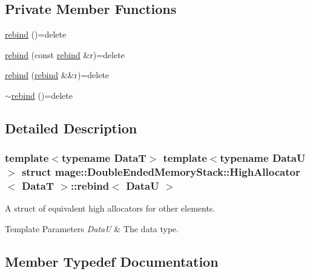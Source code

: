 \subsection*{Private Member Functions}
\begin{DoxyCompactItemize}
\item 
\hyperlink{structmage_1_1_double_ended_memory_stack_1_1_high_allocator_1_1rebind_ae8b23efa6f7435efbab9add1ce097c99}{rebind} ()=delete
\item 
\hyperlink{structmage_1_1_double_ended_memory_stack_1_1_high_allocator_1_1rebind_a88c79557499775912a9697151b0a6282}{rebind} (const \hyperlink{structmage_1_1_double_ended_memory_stack_1_1_high_allocator_1_1rebind}{rebind} \&r)=delete
\item 
\hyperlink{structmage_1_1_double_ended_memory_stack_1_1_high_allocator_1_1rebind_a8027a8c5ed9e55a9e3db30f0d9dc3347}{rebind} (\hyperlink{structmage_1_1_double_ended_memory_stack_1_1_high_allocator_1_1rebind}{rebind} \&\&r)=delete
\item 
\hyperlink{structmage_1_1_double_ended_memory_stack_1_1_high_allocator_1_1rebind_a6773f76027334ab9887e27d71dfe40f7}{$\sim$rebind} ()=delete
\end{DoxyCompactItemize}


\subsection{Detailed Description}
\subsubsection*{template$<$typename DataT$>$\newline
template$<$typename DataU$>$\newline
struct mage\+::\+Double\+Ended\+Memory\+Stack\+::\+High\+Allocator$<$ Data\+T $>$\+::rebind$<$ Data\+U $>$}

A struct of equivalent high allocators for other elements.


\begin{DoxyTemplParams}{Template Parameters}
{\em DataU} & The data type. \\
\hline
\end{DoxyTemplParams}


\subsection{Member Typedef Documentation}
\hypertarget{structmage_1_1_double_ended_memory_stack_1_1_high_allocator_1_1rebind_aee127399c76826ea9b23986ee10f19fa}{}\label{structmage_1_1_double_ended_memory_stack_1_1_high_allocator_1_1rebind_aee127399c76826ea9b23986ee10f19fa} 
